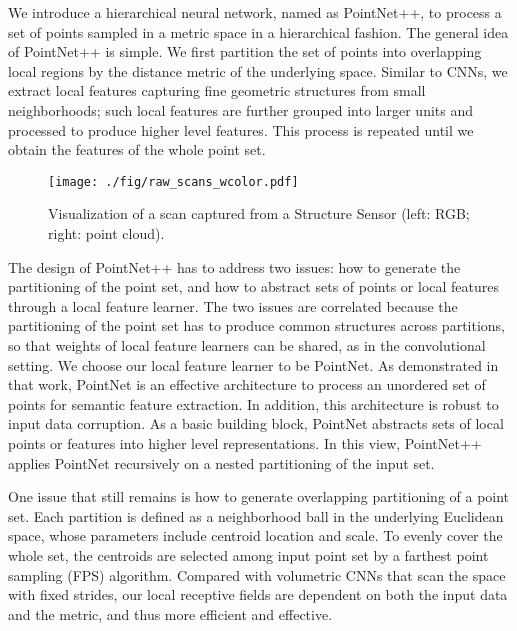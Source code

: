\documentclass{article}
\begin{document}
We introduce a hierarchical neural network, named as PointNet++, to process a set of points sampled in a metric space in a hierarchical fashion. The general idea of PointNet++ is simple. We first partition the set of points into overlapping local regions by the distance metric of the underlying space. Similar to CNNs, we extract local features capturing fine geometric structures from small neighborhoods; such local features are further grouped into larger units and processed to produce higher level features. This process is repeated until we obtain the features of the whole point set. 

\begin{wrapfigure}{R}{7cm}
\begin{center}
    \texttt{[image: ./fig/raw\_scans\_wcolor.pdf]}
  \end{center}  \caption{Visualization of a scan captured from a Structure Sensor (left: RGB; right: point cloud).}
  \label{fig:rawscans}
\end{wrapfigure}

The design of PointNet++ has to address two issues: how to generate the partitioning of the point set, and how to abstract sets of points or local features through a local feature learner. The two issues are correlated because the partitioning of the point set has to produce common structures across partitions, so that weights of local feature learners can be shared, as in the convolutional setting. We choose our local feature learner to be PointNet. As demonstrated in that work, PointNet is an effective architecture to process an unordered set of points for semantic feature extraction. In addition, this architecture is robust to input data corruption. As a basic building block, PointNet abstracts sets of local points or features into higher level representations. In this view, PointNet++ applies PointNet recursively on a nested partitioning of the input set. 

One issue that still remains is how to generate overlapping partitioning of a point set. Each partition is defined as a neighborhood ball in the underlying Euclidean space, whose parameters include centroid location and scale. To evenly cover the whole set, the centroids are selected among input point set by a farthest point sampling (FPS) algorithm. Compared with volumetric CNNs that scan the space with fixed strides, our local receptive fields are dependent on both the input data and the metric, and thus more efficient and effective. 
\end{document}
